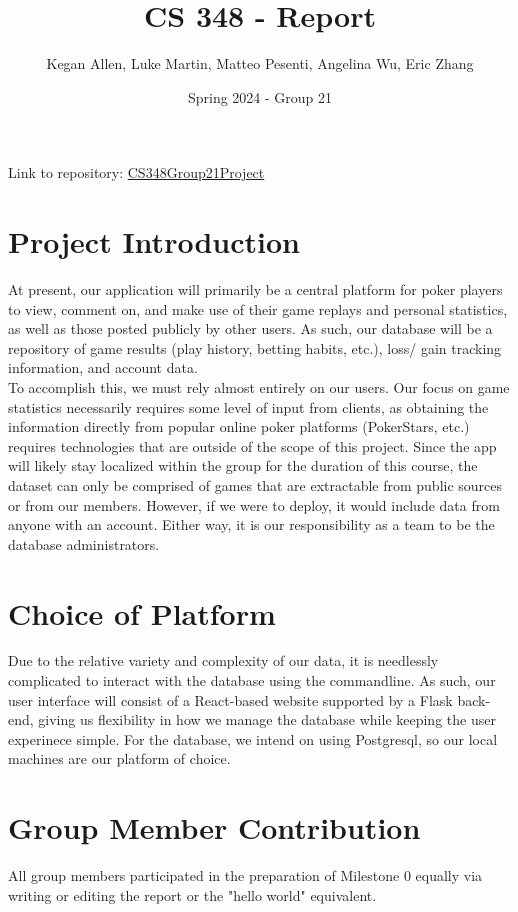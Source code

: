 \documentclass{article}
\title{CS 348 - Report}
\author{Kegan Allen, Luke Martin, Matteo Pesenti, Angelina Wu, Eric Zhang}
\date{Spring 2024 - Group 21}
\begin{document}
\maketitle

\noindent Link to repository: \href{https://github.com/LukasMartini/CS348Group21Project}{CS348Group21Project}

\section{Project Introduction}


At present, our application will primarily be a central platform for poker players to view, comment on, and make use of their game replays and personal statistics,
as well as those posted publicly by other users. As such, our database will be a repository of game results (play history, betting habits, etc.), loss/ gain
tracking information, and account data. \\

\noindent To accomplish this, we must rely almost entirely on our users. Our focus on game statistics necessarily requires some level of input from clients, 
as obtaining the information directly from popular online poker platforms (PokerStars, etc.) requires technologies that are outside of the scope of this project. 
Since the app will likely stay localized within the group for the duration of this course, the dataset can only be comprised of games that are extractable from public sources
or from our members. However, if we were to deploy, it would include data from anyone with an account. 
Either way, it is our responsibility as a team to be the database administrators.

\section{Choice of Platform}


Due to the relative variety and complexity of our data, it is needlessly complicated to interact with the database using the commandline.
As such, our user interface will consist of a React-based website supported by a Flask back-end, giving us flexibility in how we manage the database 
while keeping the user experinece simple. For the database, we intend on using Postgresql, so our local machines are our platform of choice.

\section{Group Member Contribution}

All group members participated in the preparation of Milestone 0 equally via writing or editing the report or the "hello world" equivalent.
\end{document}
